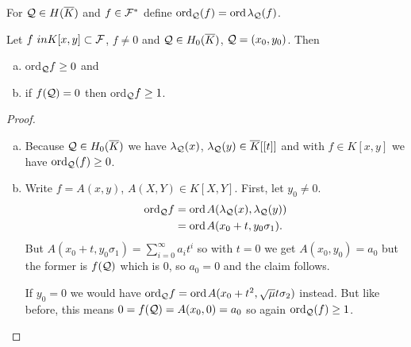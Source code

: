 \documentclass[english,11pt,a4paper]{article}
\begin{document}
\begin{defin}
   For $\mathcal{Q} \in H(\overline K)$ and $f \in \mathcal{F}^*$ define $\text{ord}_{\mathcal{Q}} (f) = \text{ord\hspace{0.4mm}} \lambda_{\mathcal{Q}} (f)$.
\end{defin}


\begin{lemma}\label{one}
  Let $f \ in K[x,y] \subset \F$, $f \neq 0$ and $\mathcal{Q} \in H_0(\overline K)$, $\mathcal{Q} = (x_0,y_0)$. Then
  \begin{enumerate}[(a)]\parskip 1mm
	  \item ord$_{\mathcal{Q}} f \geq 0$ and
	  \item if $f(\mathcal{Q}) = 0$ then ord$_{\mathcal{Q}} f \geq 1$.
	\end{enumerate}\parskip 3mm
	\begin{proof}\hfill
		\begin{enumerate}[(a)]\parskip 1mm
	  	\item Because $\mathcal{Q} \in H_0(\overline K)$ we have $\lambda_{\mathcal{Q}}(x)$, $\lambda_{\mathcal{Q}}(y) \in \overline K[[t]]$ and with $f \in K[x,y]$ we have $\text{ord}_{\mathcal{Q}} (f) \geq 0$.
	  	\item Write $f = A(x,y)$, $A(X,Y) \in K[X,Y]$. First, let $y_0 \neq 0$.
	  	\begin{align*}
	  	  \text{ord}_{\mathcal{Q}} f &= \text{ord\hspace{0.4mm}} A(\lambda_{\mathcal{Q}}(x), \lambda_{\mathcal{Q}}(y))\\
	  	  &= \text{ord\hspace{0.4mm}} A(x_0 + t, y_0 \sigma_1).
	  	\end{align*}
	  	But $A(x_0 + t, y_0 \sigma_1)=\sum_{i=0}^{\infty} a_i t^i$ so with $t=0$ we get $A(x_0, y_0)=a_0$ but the former is $f(\mathcal{Q})$ which is $0$, so $a_0 = 0$ and the claim follows.

	  	If $y_0 = 0$ we would have $\text{ord}_{\mathcal{Q}} f = \text{ord\hspace{0.4mm}} A(x_0 + t^2, \sqrt \mu t \sigma_2)$ instead. But like before, this means $0 = f(\mathcal{Q}) = A(x_0, 0) = a_0$ so again $\text{ord}_{\mathcal{Q}} (f) \geq 1$.
		\end{enumerate}\parskip 3mm
	\end{proof}
\end{lemma}
\end{document}
